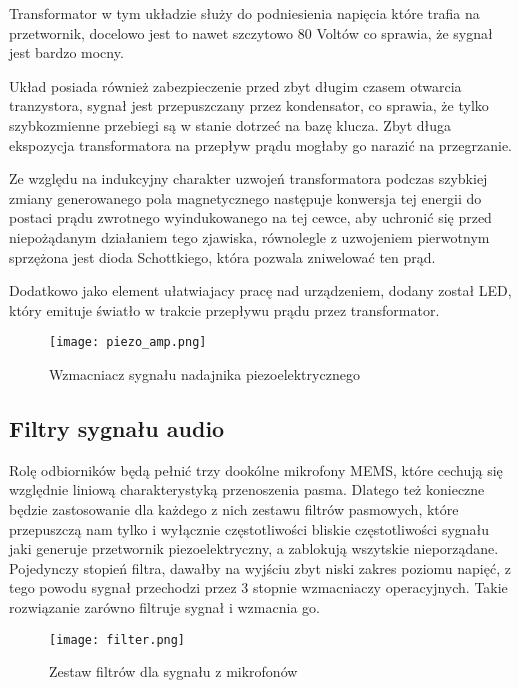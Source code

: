 Transformator w tym układzie służy do podniesienia napięcia które trafia na przetwornik, docelowo jest to nawet szczytowo 80 Voltów co sprawia, 
że sygnał jest bardzo mocny.

Układ posiada również zabezpieczenie przed zbyt długim czasem otwarcia tranzystora, sygnał jest przepuszczany przez kondensator, 
co sprawia, że tylko szybkozmienne przebiegi są w stanie dotrzeć na bazę klucza. 
Zbyt długa ekspozycja transformatora na przepływ prądu mogłaby go narazić na przegrzanie.

Ze względu na indukcyjny charakter uzwojeń transformatora podczas szybkiej zmiany generowanego pola magnetycznego następuje 
konwersja tej energii do postaci prądu zwrotnego wyindukowanego na tej cewce, aby uchronić się przed niepożądanym działaniem tego zjawiska, 
równolegle z uzwojeniem pierwotnym sprzężona jest dioda Schottkiego, która pozwala zniwelować ten prąd.

Dodatkowo jako element ułatwiajacy pracę nad urządzeniem, dodany został LED, który emituje światło w trakcie przepływu prądu przez transformator.
\begin{figure}[ht!]
    \centering
    \texttt{[image: piezo\_amp.png]}
    \caption{Wzmacniacz sygnału nadajnika piezoelektrycznego}
    \label{fig:piezo_amp}
\end{figure}

\subsection{Filtry sygnału audio}

Rolę odbiorników będą pełnić trzy dookólne mikrofony MEMS, które cechują się względnie liniową charakterystyką przenoszenia pasma. 
Dlatego też konieczne będzie zastosowanie dla każdego z nich zestawu filtrów pasmowych, które przepuszczą nam tylko i wyłącznie częstotliwości bliskie częstotliwości 
sygnału jaki generuje przetwornik piezoelektryczny, a zablokują wszytskie nieporządane. 
Pojedynczy stopień filtra, dawałby na wyjściu zbyt niski zakres poziomu napięć, 
z tego powodu sygnał przechodzi przez 3 stopnie wzmacniaczy operacyjnych. Takie rozwiązanie zarówno filtruje sygnał i wzmacnia go.
\begin{figure}[ht!]
    \centering
    \texttt{[image: filter.png]}
    \caption{Zestaw filtrów dla sygnału z mikrofonów}
    \label{fig:filter}
\end{figure}


